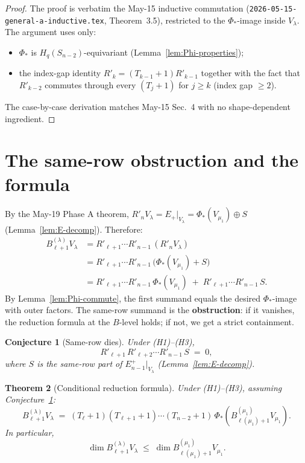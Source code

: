 \documentclass[11pt]{article}
\newtheorem{theorem}{Theorem}
\newtheorem{conjecture}[theorem]{Conjecture}
\theoremstyle{definition}
\begin{document}
\begin{proof}
The proof is verbatim the May-15 inductive commutation
(\texttt{2026-05-15-general-a-inductive.tex}, Theorem~3.5), restricted
to the $\Phi_*$-image inside $V_\lambda$. The argument uses only:
\begin{itemize}[leftmargin=2em,topsep=0.2em,itemsep=0.1em]
\item $\Phi_*$ is $H_q(S_{n-2})$-equivariant
(Lemma~\ref{lem:Phi-properties});
\item the index-gap identity $R'_k = (T_{k-1}{+}1) R'_{k-1}$ together
with the fact that $R'_{k-2}$ commutes through every $(T_j{+}1)$ for
$j \ge k$ (index gap $\ge 2$).
\end{itemize}
The case-by-case derivation matches May-15 Sec.~4 with no
shape-dependent ingredient.
\end{proof}

\section{The same-row obstruction and the formula}\label{sec:obstruction}

By the May-19 Phase A theorem, $R'_n V_\lambda = E_+|_{V_\lambda} =
\Phi_*(V_{\mu_1}) \oplus S$ (Lemma~\ref{lem:E-decomp}). Therefore:
\begin{align*}
   B_{\ell+1}^{(\lambda)} V_\lambda
   &= R'_{\ell+1}\cdots R'_{n-1}\,(R'_n V_\lambda) \\
   &= R'_{\ell+1}\cdots R'_{n-1}\,\big(\Phi_*(V_{\mu_1}) + S\big) \\
   &= R'_{\ell+1}\cdots R'_{n-1}\,\Phi_*(V_{\mu_1})
     \;+\; R'_{\ell+1}\cdots R'_{n-1}\,S.
\end{align*}
By Lemma~\ref{lem:Phi-commute}, the first summand equals the desired
$\Phi_*$-image with outer factors. The same-row summand is the
\textbf{obstruction}: if it vanishes, the reduction formula at the
$B$-level holds; if not, we get a strict containment.

\begin{conjecture}[Same-row dies]\label{conj:same-row-dies}
Under (H1)--(H3),
\[
   R'_{\ell+1}\,R'_{\ell+2}\cdots R'_{n-1}\,S \;=\; 0,
\]
where $S$ is the same-row part of $E_{n-1}^+|_{V_\lambda}$
(Lemma~\ref{lem:E-decomp}).
\end{conjecture}

\begin{theorem}[Conditional reduction formula]\label{thm:cond-reduction}
Under (H1)--(H3), assuming Conjecture~\ref{conj:same-row-dies}:
\begin{equation}\label{eq:reduction}
   B_{\ell+1}^{(\lambda)} V_\lambda
   \;=\;
   (T_\ell{+}1)(T_{\ell+1}{+}1)\cdots(T_{n-2}{+}1)\,
   \Phi_*\!\left(B_{\ell(\mu_1)+1}^{(\mu_1)} V_{\mu_1}\right).
\end{equation}
In particular,
\begin{equation}\label{eq:dim-upper}
   \dim B_{\ell+1}^{(\lambda)} V_\lambda \;\le\; \dim B^{(\mu_1)}_{\ell(\mu_1)+1} V_{\mu_1}.
\end{equation}
\end{theorem}
\end{document}
